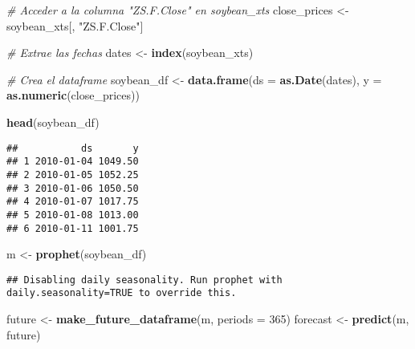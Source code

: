 \documentclass[
]{book}
\newenvironment{Shaded}{\begin{snugshade}}{\end{snugshade}}
\newcommand{\AttributeTok}[1]{\textcolor[rgb]{0.13,0.29,0.53}{#1}}
\newcommand{\CommentTok}[1]{\textcolor[rgb]{0.56,0.35,0.01}{\textit{#1}}}
\newcommand{\DecValTok}[1]{\textcolor[rgb]{0.00,0.00,0.81}{#1}}
\newcommand{\FunctionTok}[1]{\textcolor[rgb]{0.13,0.29,0.53}{\textbf{#1}}}
\newcommand{\NormalTok}[1]{#1}
\newcommand{\OtherTok}[1]{\textcolor[rgb]{0.56,0.35,0.01}{#1}}
\newcommand{\StringTok}[1]{\textcolor[rgb]{0.31,0.60,0.02}{#1}}
\begin{document}
\begin{Shaded}
\begin{Highlighting}[]
\CommentTok{\# Acceder a la columna "ZS.F.Close" en soybean\_xts}
\NormalTok{close\_prices }\OtherTok{\textless{}{-}}\NormalTok{ soybean\_xts[, }\StringTok{"ZS.F.Close"}\NormalTok{]}

\CommentTok{\# Extrae las fechas}
\NormalTok{dates }\OtherTok{\textless{}{-}} \FunctionTok{index}\NormalTok{(soybean\_xts)}

\CommentTok{\# Crea el dataframe}
\NormalTok{soybean\_df }\OtherTok{\textless{}{-}} \FunctionTok{data.frame}\NormalTok{(}\AttributeTok{ds =} \FunctionTok{as.Date}\NormalTok{(dates), }
\AttributeTok{y =} \FunctionTok{as.numeric}\NormalTok{(close\_prices))}
\end{Highlighting}
\end{Shaded}

\begin{Shaded}
\begin{Highlighting}[]
\FunctionTok{head}\NormalTok{(soybean\_df)}
\end{Highlighting}
\end{Shaded}

\begin{verbatim}
##           ds       y
## 1 2010-01-04 1049.50
## 2 2010-01-05 1052.25
## 3 2010-01-06 1050.50
## 4 2010-01-07 1017.75
## 5 2010-01-08 1013.00
## 6 2010-01-11 1001.75
\end{verbatim}

\begin{Shaded}
\begin{Highlighting}[]
\NormalTok{m }\OtherTok{\textless{}{-}} \FunctionTok{prophet}\NormalTok{(soybean\_df)}
\end{Highlighting}
\end{Shaded}

\begin{verbatim}
## Disabling daily seasonality. Run prophet with daily.seasonality=TRUE to override this.
\end{verbatim}

\begin{Shaded}
\begin{Highlighting}[]
\NormalTok{future }\OtherTok{\textless{}{-}} \FunctionTok{make\_future\_dataframe}\NormalTok{(m, }\AttributeTok{periods =} \DecValTok{365}\NormalTok{) }
\NormalTok{forecast }\OtherTok{\textless{}{-}} \FunctionTok{predict}\NormalTok{(m, future)}
\end{Highlighting}
\end{Shaded}
\end{document}
